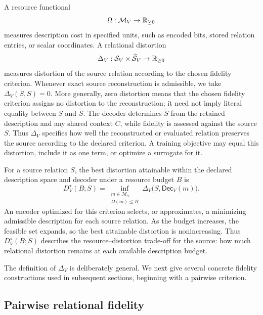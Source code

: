 A resource functional
\begin{equation}
\Omega:\mathcal M_V\to\mathbb{R}_{\ge0}
\end{equation}
measures description cost in specified units, such as encoded bits, stored relation entries, or scalar coordinates.
A relational distortion
\begin{equation}
\Delta_V:\mathcal S_V\times\widehat{\mathcal S}_V\to\mathbb{R}_{\ge0}
\end{equation}
measures distortion of the source relation according to the chosen fidelity criterion.
Whenever exact source reconstruction is admissible, we take $\Delta_V(S,S)=0$.
More generally, zero distortion means that the chosen fidelity criterion assigns no distortion to the reconstruction; it need not imply literal equality between $S$ and $\widetilde S$.
The decoder determines $\widetilde S$ from the retained description and any shared context $C$, while fidelity is assessed against the source $S$.
Thus $\Delta_V$ specifies how well the reconstructed or evaluated relation preserves the source according to the declared criterion.
A training objective may equal this distortion, include it as one term, or optimize a surrogate for it.

For a source relation $S$, the best distortion attainable within the declared description space and decoder under a resource budget $B$ is
\begin{equation}
D_V^\star(B;S)
=
\inf_{\substack{m\in\mathcal M_V\\\Omega(m)\le B}}
\Delta_V\bigl(S,\mathsf{Dec}_V(m)\bigr).
\label{eq:lossy-relational-compression}
\end{equation}
An encoder optimized for this criterion selects, or approximates, a minimizing admissible description for each source relation.
As the budget increases, the feasible set expands, so the best attainable distortion is nonincreasing.
Thus $D_V^\star(B;S)$ describes the resource--distortion trade-off for the source: how much relational distortion remains at each available description budget.

The definition of $\Delta_V$ is deliberately general.
We next give several concrete fidelity constructions used in subsequent sections, beginning with a pairwise criterion.

\subsection{Pairwise relational fidelity}


